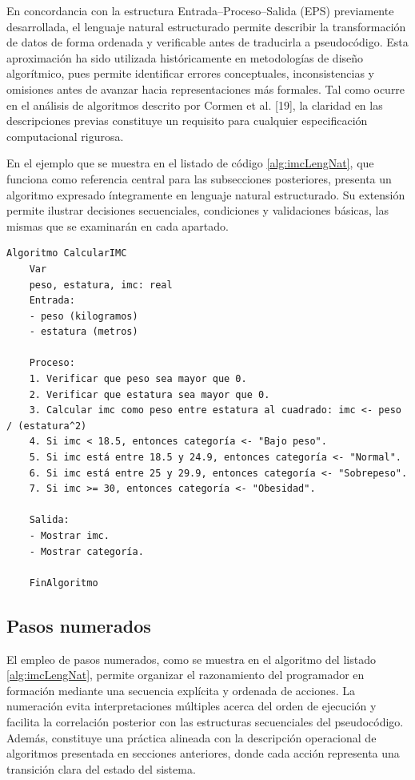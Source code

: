 \documentclass[12pt,twoside]{book}
\begin{document}
				En concordancia con la estructura Entrada–Proceso–Salida (EPS) previamente desarrollada, el lenguaje natural estructurado permite describir la transformación de datos de forma ordenada y verificable antes de traducirla a pseudocódigo. Esta aproximación ha sido utilizada históricamente en metodologías de diseño algorítmico, pues permite identificar errores conceptuales, inconsistencias y omisiones antes de avanzar hacia representaciones más formales. Tal como ocurre en el análisis de algoritmos descrito por Cormen et al. [19], la claridad en las descripciones previas constituye un requisito para cualquier especificación computacional rigurosa.
				
				En el ejemplo que se muestra en el listado de código \ref{alg:imcLengNat}, que funciona como referencia central para las subsecciones posteriores, presenta un algoritmo expresado íntegramente en lenguaje natural estructurado. Su extensión permite ilustrar decisiones secuenciales, condiciones y validaciones básicas, las mismas que se examinarán en cada apartado.
				
				\begin{lstlisting}[language={},caption={Algoritmo en lenguaje natural estructurado para calcular el índice de masa corporal (IMC)},label={alg:imcLengNat}]
	Algoritmo CalcularIMC
	Var
	peso, estatura, imc: real
	Entrada:
	- peso (kilogramos)
	- estatura (metros)
	
	Proceso:
	1. Verificar que peso sea mayor que 0.
	2. Verificar que estatura sea mayor que 0.
	3. Calcular imc como peso entre estatura al cuadrado: imc <- peso / (estatura^2)
	4. Si imc < 18.5, entonces categoría <- "Bajo peso".
	5. Si imc está entre 18.5 y 24.9, entonces categoría <- "Normal".
	6. Si imc está entre 25 y 29.9, entonces categoría <- "Sobrepeso".
	7. Si imc >= 30, entonces categoría <- "Obesidad".
	
	Salida:
	- Mostrar imc.
	- Mostrar categoría.
	
	FinAlgoritmo \end{lstlisting}
				
				\subsection{Pasos numerados}
					El empleo de pasos numerados, como se muestra en el algoritmo del listado \ref{alg:imcLengNat}, permite organizar el razonamiento del programador en formación mediante una secuencia explícita y ordenada de acciones. La numeración evita interpretaciones múltiples acerca del orden de ejecución y facilita la correlación posterior con las estructuras secuenciales del pseudocódigo. Además, constituye una práctica alineada con la descripción operacional de algoritmos presentada en secciones anteriores, donde cada acción representa una transición clara del estado del sistema.
					
\end{document}
